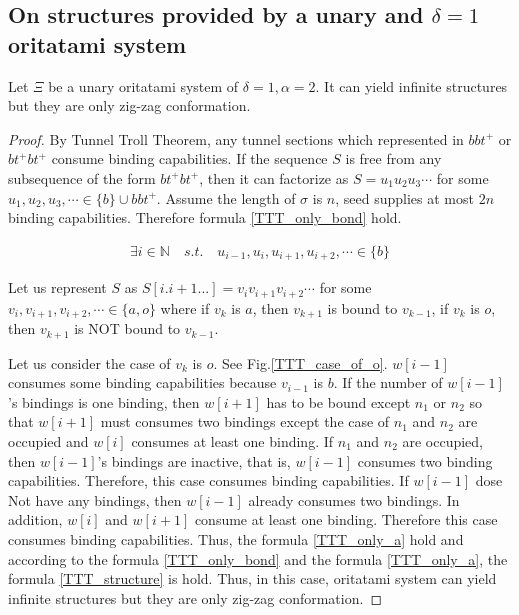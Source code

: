 \documentclass[runningheads]{llncs}
\begin{document}
\subsection{On structures provided by a unary and $\delta = 1$ oritatami system}
\begin{theorem}[$\delta= 1, \alpha=2$]
Let $\Xi$ be a unary oritatami system of $\delta = 1, \alpha = 2$. It can yield infinite structures but they are only zig-zag conformation.
\end{theorem}

\begin{proof}
By Tunnel Troll Theorem, any tunnel sections which represented in $bbt^+$ or $bt^+bt^+$ consume binding capabilities. If the sequence $S$ is free from any subsequence of the form $bt^+bt^+$, then it can factorize as $S = u_1 u_2 u_3 \cdots$ for some $u_1 , u_2 , u_3 , \cdots \in \{b\} \cup bbt^+$. Assume the length of $\sigma$ is $n$, seed supplies at most $2n$ binding capabilities. Therefore formula \ref{TTT_only_bond} hold.

\begin{eqnarray}
  \exists i \in \mathbb{N} \quad s.t. \quad u_{i-1} , u_i , u_{i+1} , u_{i+2} , \cdots \in \{ b \}
  \label{TTT_only_bond}
\end{eqnarray}


Let us represent $S$ as $S[i.i+1...] = v_i v_{i+1} v_{i+2} \cdots$ for some $v_i, v_{i+1}, v_{i+2}, \cdots \in \{ a, o\}$ where if $v_k$ is $a$, then $v_{k+1}$ is bound to $v_{k-1}$, if $v_k$ is $o$, then $v_{k+1}$ is NOT bound to $v_{k-1}$.


Let us consider the case of $v_k$ is $o$. See Fig.\ref{TTT_case_of_o}. $w[i-1]$ consumes some binding capabilities because $v_{i-1}$ is $b$. If the number of $w[i-1]$'s bindings is one binding, then $w[i+1]$ has to be bound except $n_1$ or $n_2$ so that $w[i+1]$ must consumes two bindings except the case of $n_1$ and $n_2$ are occupied and $w[i]$ consumes at least one binding. If $n_1$ and $n_2$ are occupied, then $w[i-1]$'s bindings are inactive, that is, $w[i-1]$ consumes two binding capabilities. Therefore, this case consumes binding capabilities. If $w[i-1]$ dose Not have any bindings, then $w[i-1]$ already consumes two bindings. In addition, $w[i]$ and $w[i+1]$ consume at least one binding. Therefore this case consumes binding capabilities. Thus, the formula \ref{TTT_only_a} hold and according to the formula \ref{TTT_only_bond} and the formula \ref{TTT_only_a}, the formula \ref{TTT_structure} is hold. Thus, in this case, oritatami system can yield infinite structures but they are only zig-zag conformation.

\end{proof}
\end{document}
